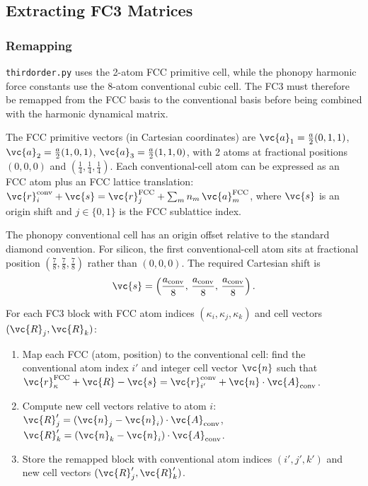 \subsection{Extracting FC3 Matrices}
\label{sec:fc3_extraction}

\subsubsection{Remapping}

\texttt{thirdorder.py} uses the 2-atom FCC primitive cell, while the phonopy
harmonic force constants use the 8-atom
conventional cubic cell.  The FC3 must therefore be
remapped from the FCC basis to the conventional basis before being
combined with the harmonic dynamical matrix.

The FCC primitive vectors (in Cartesian coordinates) are
$\vc{a}_1 = \tfrac{a}{2}(0,1,1)$,
$\vc{a}_2 = \tfrac{a}{2}(1,0,1)$,
$\vc{a}_3 = \tfrac{a}{2}(1,1,0)$, with 2 atoms at fractional
positions $(0,0,0)$ and $(\tfrac{1}{4},\tfrac{1}{4},\tfrac{1}{4})$.
Each conventional-cell atom can be expressed as an FCC atom plus an
FCC lattice translation:
$\vc{r}_i^\mathrm{conv} + \vc{s}
= \vc{r}_{j}^\mathrm{FCC} + \sum_m n_m\,\vc{a}_m^\mathrm{FCC}$,
where $\vc{s}$ is an origin shift and $j \in \{0, 1\}$ is the FCC
sublattice index.

The phonopy conventional cell has an origin offset relative to the
standard diamond convention.  For silicon, the first
conventional-cell atom sits at fractional position
$(\tfrac{7}{8}, \tfrac{7}{8}, \tfrac{7}{8})$ rather than $(0,0,0)$.
The required Cartesian shift is
\begin{equation}\label{eq:shift}
  \vc{s} = \left(\frac{a_\mathrm{conv}}{8},\,
                  \frac{a_\mathrm{conv}}{8},\,
                  \frac{a_\mathrm{conv}}{8}\right).
\end{equation}

For each FC3 block with FCC atom indices
$(\kappa_i, \kappa_j, \kappa_k)$ and cell vectors
$(\vc{R}_j, \vc{R}_k)$:
\begin{enumerate}
  \item Map each FCC (atom, position) to the conventional cell: find
        the conventional atom index $i'$ and integer cell vector
        $\vc{n}$ such that
        $\vc{r}^\mathrm{FCC}_\kappa + \vc{R} - \vc{s}
         = \vc{r}^\mathrm{conv}_{i'} + \vc{n}\cdot\vc{A}_\mathrm{conv}$.
  \item Compute new cell vectors relative to atom $i$:
        $\vc{R}'_j = (\vc{n}_j - \vc{n}_i)\cdot\vc{A}_\mathrm{conv}$,
        $\vc{R}'_k = (\vc{n}_k - \vc{n}_i)\cdot\vc{A}_\mathrm{conv}$.
  \item Store the remapped block with conventional atom indices
        $(i', j', k')$ and new cell vectors $(\vc{R}'_j, \vc{R}'_k)$.
\end{enumerate}

